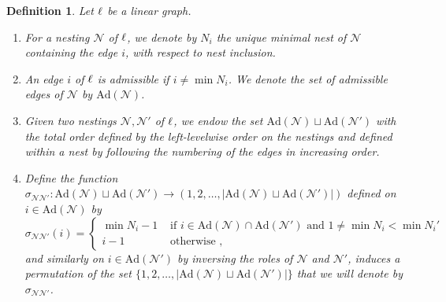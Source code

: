 \documentclass[twoside, 12pt]{amsart}
\newtheorem{definition}{Definition}[section]
\theoremstyle{remark}
\begin{document}
\begin{definition} 
\label{def:signs}
Let $\ell$ be a linear graph.  
\begin{enumerate}[leftmargin=*]
\item For a nesting $\mathcal{N}$ of $\ell$, we denote by $N_i$ the unique minimal nest of $\mathcal{N}$ containing the edge $i$, with respect to nest inclusion. 
\item An edge $i$ of $\ell$ is \emph{admissible} if $i \neq \min N_i$. We denote the set of admissible edges of $\mathcal{N}$ by $\mathrm{Ad}(\mathcal{N})$. 
\item Given two nestings $\mathcal{N}, \mathcal{N}'$ of $\ell$, we endow the set $\mathrm{Ad}(\mathcal{N})\sqcup \mathrm{Ad}(\mathcal{N}')$ with the total order defined by the left-levelwise order on the nestings and defined within a nest by following the numbering of the edges in increasing order. 
\item Define the function $\sigma_{\mathcal{N}\mathcal{N}'}: \mathrm{Ad}(\mathcal{N})\sqcup \mathrm{Ad}(\mathcal{N}') \to (1,2,\ldots,|\mathrm{Ad}(\mathcal{N})\sqcup \mathrm{Ad}(\mathcal{N}')|)$ defined on $i \in \mathrm{Ad}(\mathcal{N})$ by 
\begin{equation*}
  \sigma_{\mathcal{N}\mathcal{N}'}(i)= 
  \begin{cases}
    \min N_i -1 & \text{ if } i \in \mathrm{Ad}(\mathcal{N})\cap \mathrm{Ad}(\mathcal{N}') \text{ and } 1 \neq \min N_i < \min N_i' \\ 
    i-1 & \text{ otherwise ,} 
  \end{cases}
\end{equation*}
and similarly on $i \in \mathrm{Ad}(\mathcal{N}')$ by inversing the roles of $\mathcal{N}$ and $\mathcal{N}'$, induces a permutation of the set $\{1,2,\ldots,|\mathrm{Ad}(\mathcal{N})\sqcup \mathrm{Ad}(\mathcal{N}')|\}$ that we will denote by $\sigma_{\mathcal{N}\mathcal{N}'}$.
\end{enumerate}
\end{definition}

\end{document}
